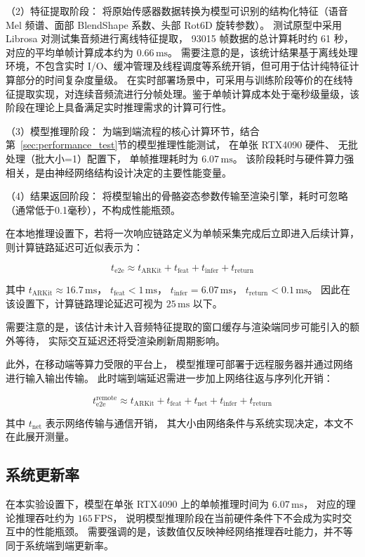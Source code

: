 （2）特征提取阶段：
将原始传感器数据转换为模型可识别的结构化特征（语音 Mel 频谱、面部 BlendShape 系数、头部 Rot6D 旋转参数）。
测试原型中采用 Librosa\cite{librosa} 对测试集音频进行离线特征提取，
93015 帧数据的总计算耗时约 61 秒，对应的平均单帧计算成本约为 $0.66\,\mathrm{ms}$。
需要注意的是，该统计结果基于离线处理环境，不包含实时 I/O、缓冲管理及线程调度等系统开销，但可用于估计纯特征计算部分的时间复杂度量级。
在实时部署场景中，可采用与训练阶段等价的在线特征提取实现，对连续音频流进行分帧处理。鉴于单帧计算成本处于毫秒级量级，该阶段在理论上具备满足实时推理需求的计算可行性。

（3）模型推理阶段：
为端到端流程的核心计算环节，结合第~\ref{sec:performance_test}节的模型推理性能测试，
在单张 RTX4090 硬件、
无批处理（批大小=1）配置下，
单帧推理耗时为 $6.07\,\mathrm{ms}$。
该阶段耗时与硬件算力强相关，是由神经网络结构设计决定的主要性能变量。

（4）结果返回阶段：
将模型输出的骨骼姿态参数传输至渲染引擎，耗时可忽略（通常低于0.1毫秒），不构成性能瓶颈。

在本地推理设置下，若将一次响应链路定义为单帧采集完成后立即进入后续计算，
则计算链路延迟可近似表示为：

\begin{equation}
t_{\mathrm{e2e}} \approx t_{\mathrm{ARKit}} + t_{\mathrm{feat}} + t_{\mathrm{infer}} + t_{\mathrm{return}}
\end{equation}

其中 $t_{\mathrm{ARKit}}\approx16.7\,\mathrm{ms}$，
$t_{\mathrm{feat}}<1\,\mathrm{ms}$，
$t_{\mathrm{infer}}=6.07\,\mathrm{ms}$，
$t_{\mathrm{return}}<0.1\,\mathrm{ms}$。
因此在该设置下，计算链路理论延迟可视为 $25\,\mathrm{ms}$ 以下。

需要注意的是，该估计未计入音频特征提取的窗口缓存与渲染端同步可能引入的额外等待，
实际交互延迟还将受渲染刷新周期影响。

此外，在移动端等算力受限的平台上，
模型推理可部署于远程服务器并通过网络进行输入输出传输。
此时端到端延迟需进一步加上网络往返与序列化开销：

\begin{equation}
t_{\mathrm{e2e}}^{\mathrm{remote}}
\approx
t_{\mathrm{ARKit}} + t_{\mathrm{feat}} + t_{\mathrm{net}} + t_{\mathrm{infer}} + t_{\mathrm{return}}
\end{equation}

其中 $t_{\mathrm{net}}$ 表示网络传输与通信开销，
其大小由网络条件与系统实现决定，本文不在此展开测量。

\subsection{系统更新率}
在本实验设置下，模型在单张 RTX4090 上的单帧推理时间为 $6.07\,\mathrm{ms}$，
对应的理论推理吞吐约为 $165\,\mathrm{FPS}$，
说明模型推理阶段在当前硬件条件下不会成为实时交互中的性能瓶颈。
需要强调的是，该数值仅反映神经网络推理吞吐能力，并不等同于系统端到端更新率。

